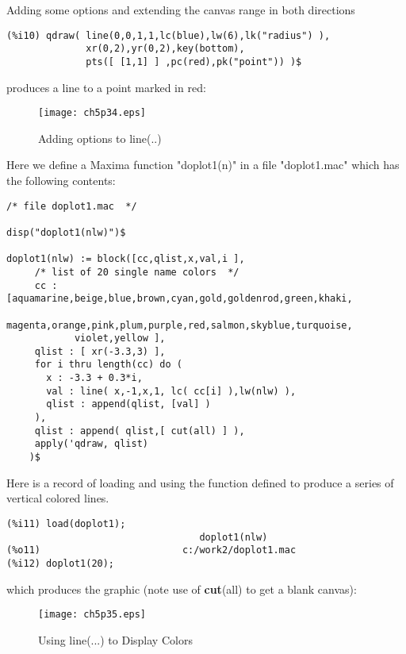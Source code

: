 \documentclass[12pt]{article}
\begin{document}
\smallskip
Adding some options and extending the canvas range in both directions
\small
\begin{verbatim}
(%i10) qdraw( line(0,0,1,1,lc(blue),lw(6),lk("radius") ),
              xr(0,2),yr(0,2),key(bottom),
              pts([ [1,1] ] ,pc(red),pk("point")) )$
\end{verbatim}
\normalsize
produces a line to a point marked in red:
\begin{figure} [h]
   \centerline{\texttt{[image: ch5p34.eps]} }
	\caption{Adding options to line(..) }
\end{figure}      
\newpage
Here we define a Maxima function "doplot1(n)" in a file "doplot1.mac" which has the
  following contents:
\small
\begin{verbatim}
/* file doplot1.mac  */

disp("doplot1(nlw)")$

doplot1(nlw) := block([cc,qlist,x,val,i ],
     /* list of 20 single name colors  */
     cc : [aquamarine,beige,blue,brown,cyan,gold,goldenrod,green,khaki,
            magenta,orange,pink,plum,purple,red,salmon,skyblue,turquoise,
            violet,yellow ],
     qlist : [ xr(-3.3,3) ],     
     for i thru length(cc) do (
       x : -3.3 + 0.3*i,
       val : line( x,-1,x,1, lc( cc[i] ),lw(nlw) ),
       qlist : append(qlist, [val] )
     ),
     qlist : append( qlist,[ cut(all) ] ),
     apply('qdraw, qlist)
    )$                            
\end{verbatim}
\normalsize
Here is a record of loading and using the function defined to
  produce a series of vertical colored lines.
\small
\begin{verbatim}
(%i11) load(doplot1);
                                  doplot1(nlw)
(%o11)                         c:/work2/doplot1.mac
(%i12) doplot1(20);
\end{verbatim}
\normalsize
which produces the graphic (note use of \textbf{cut}(all) to get a
  blank canvas):
\begin{figure} [h]
   \centerline{\texttt{[image: ch5p35.eps]} }
	\caption{Using line(...) to Display Colors }
\end{figure}      
\newpage
\end{document}
